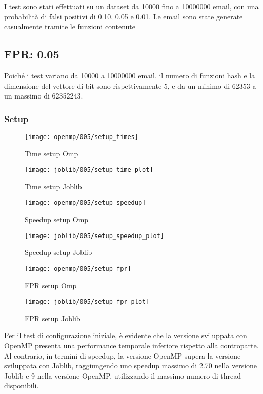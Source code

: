 I test sono stati effettuati su un dataset da 10000 fino a 10000000 email, con una probabilità di falsi positivi di
0.10, 0.05 e 0.01.
Le email sono state generate casualmente tramite le funzioni contenute

\subsection{FPR: 0.05}\label{subsec:fpr-005}
Poiché i test variano da 10000 a 10000000 email, il numero di funzioni hash e la dimensione del vettore di bit sono
rispettivamente 5, e da un minimo di 62353 a un massimo di 62352243.
\subsubsection{Setup}\label{subsubsec:fpr-005-setup}
\begin{figure}[H]
    \centering
    \texttt{[image: openmp/005/setup\_times]}
        \caption{Time setup Omp}\label{fig:005-setup_time_omp}
    \endminipage\hfill
    \texttt{[image: joblib/005/setup\_time\_plot]}
        \caption{Time setup Joblib}\label{fig:005-setup_time_joblib}
    \endminipage\hfill
\end{figure}
\begin{figure}[H]
    \centering
    \texttt{[image: openmp/005/setup\_speedup]}
        \caption{Speedup setup Omp}\label{fig:005-setup_speedup_omp}
    \endminipage\hfill
    \texttt{[image: joblib/005/setup\_speedup\_plot]}
        \caption{Speedup setup Joblib}\label{fig:005-setup_speedup_joblib}
    \endminipage\hfill
\end{figure}
\begin{figure}[H]
    \centering
    \texttt{[image: openmp/005/setup\_fpr]}
        \caption{FPR setup Omp}\label{fig:005-setup_fpr_omp}
    \endminipage\hfill
    \texttt{[image: joblib/005/setup\_fpr\_plot]}
        \caption{FPR setup Joblib}\label{fig:005-setup_fpr_joblib}
    \endminipage\hfill
\end{figure}

Per il test di configurazione iniziale, è evidente che la versione sviluppata con OpenMP presenta una performance
temporale inferiore rispetto alla controparte.
Al contrario, in termini di speedup, la versione OpenMP supera la versione sviluppata con Joblib,
raggiungendo uno speedup massimo di 2.70 nella versione Joblib e 9 nella versione OpenMP, utilizzando il massimo
numero di thread disponibili.

